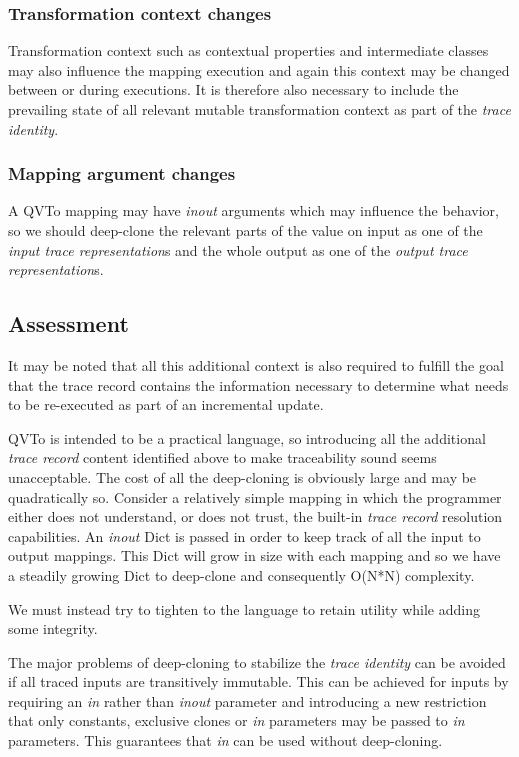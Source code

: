 \documentclass[runningheads,a4paper]{llncs}
\begin{document}
\subsubsection{Transformation context changes}

Transformation context such as contextual properties and intermediate classes may also influence the mapping execution and again this context may be changed between or during executions. It is therefore also necessary to include the prevailing state of all relevant mutable transformation context as part of the \emph{trace identity}.

\subsubsection{Mapping argument changes}

A QVTo mapping may have \emph{inout} arguments which may influence the behavior, so we should deep-clone the relevant parts of the value on input as one of the \emph{input trace representation}s and the whole output as one of the \emph{output trace representation}s.

\subsection{Assessment}

It may be noted that all this additional context is also required to fulfill the goal that the trace record contains the information necessary to determine what needs to be re-executed as part of an incremental update.

QVTo is intended to be a practical language, so introducing all the additional \emph{trace record} content identified above to make traceability sound seems unacceptable. The cost of all the deep-cloning is obviously large and may be quadratically so. Consider a relatively simple mapping in which the programmer either does not understand, or does not trust, the built-in \emph{trace record} resolution capabilities. An \emph{inout} Dict is passed in order to keep track of all the input to output mappings. This Dict will grow in size with each mapping and so we have a steadily growing Dict to deep-clone and consequently O(N*N) complexity.

We must instead try to tighten to the language to retain utility while adding some integrity.

The major problems of deep-cloning to stabilize the \emph{trace identity} can be avoided if all traced inputs are transitively immutable. This can be achieved for inputs by requiring an \emph{in} rather than \emph{inout} parameter and introducing a new restriction that only constants, exclusive clones or \emph{in} parameters may be passed to \emph{in} parameters. This guarantees that \emph{in} can be used without deep-cloning.
\end{document}
